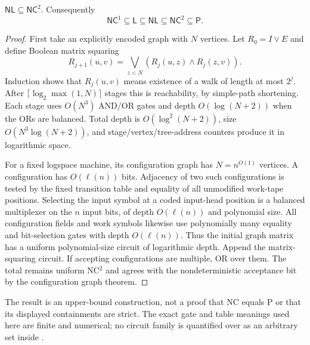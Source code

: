 \begin{theorem}\label{thm:A07}
$\mathsf{NL}\subseteq\mathsf{NC}^2$. Consequently
\[
 \mathsf{NC}^1\subseteq\mathsf L\subseteq\mathsf{NL}
 \subseteq\mathsf{NC}^2\subseteq\mathsf P.
\]
\end{theorem}
\begin{proof}
First take an explicitly encoded graph with $N$ vertices. Let $R_0=I\lor E$ and define Boolean matrix squaring
\[
 R_{j+1}(u,v)=\bigvee_{z<N}(R_j(u,z)\land R_j(z,v)).
\]
Induction shows that $R_j(u,v)$ means existence of a walk of length at most $2^j$. After $\lceil\log_2\max(1,N)\rceil$ stages this is reachability, by simple-path shortening. Each stage uses $O(N^3)$ AND/OR gates and depth $O(\log(N+2))$ when the ORs are balanced. Total depth is $O(\log^2(N+2))$, size $O(N^3\log(N+2))$, and stage/vertex/tree-address counters produce it in logarithmic space.

For a fixed logspace machine, its configuration graph has $N=n^{O(1)}$ vertices. A configuration has $O(\ell(n))$ bits. Adjacency of two such configurations is tested by the fixed transition table and equality of all unmodified work-tape positions. Selecting the input symbol at a coded input-head position is a balanced multiplexer on the $n$ input bits, of depth $O(\ell(n))$ and polynomial size. All configuration fields and work symbols likewise use polynomially many equality and bit-selection gates with depth $O(\ell(n))$. Thus the initial graph matrix has a uniform polynomial-size circuit of logarithmic depth. Append the matrix-squaring circuit. If accepting configurations are multiple, OR over them. The total remains uniform NC$^2$ and agrees with the nondeterministic acceptance bit by the configuration graph theorem.
\end{proof}

The result is an upper-bound construction, not a proof that NC equals P or that its displayed containments are strict. The exact gate and table meanings used here are finite and numerical; no circuit family is quantified over as an arbitrary set inside \ipra.
